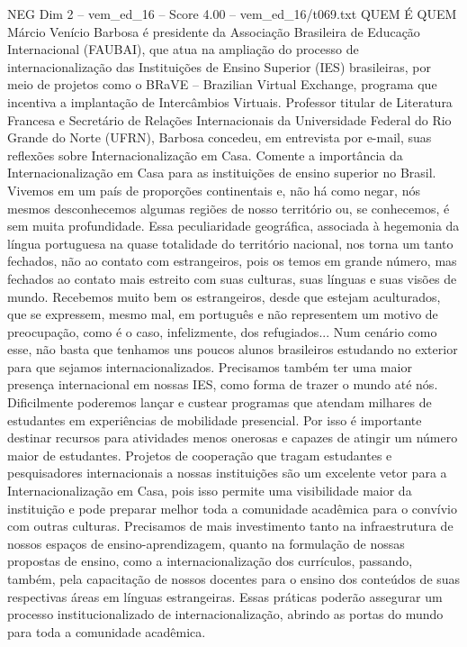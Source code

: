 \begin{textsample}{NEG Dim 2 – vem\_ed\_16 – Score 4.00 – vem\_ed\_16/t069.txt}  \label{ex:f2_neg_102}
QUEM É QUEM Márcio Venício Barbosa é presidente da Associação Brasileira de Educação Internacional (FAUBAI), que atua na ampliação do processo de internacionalização das Instituições de Ensino Superior (IES) brasileiras, por meio de projetos como o BRaVE – Brazilian Virtual Exchange, programa que incentiva a implantação de Intercâmbios Virtuais.
Professor titular de Literatura Francesa e Secretário de Relações Internacionais da Universidade Federal do Rio Grande do Norte (UFRN), Barbosa concedeu, em entrevista por e-mail, suas reflexões sobre Internacionalização em Casa.
Comente a importância da Internacionalização em Casa para as instituições de ensino superior no Brasil.
Vivemos em um país de proporções continentais e, não há como negar, nós mesmos desconhecemos algumas regiões de nosso território ou, se conhecemos, é sem muita profundidade.
Essa peculiaridade geográfica, associada à hegemonia da língua portuguesa na quase totalidade do território nacional, nos torna um tanto fechados, não ao contato com estrangeiros, pois os temos em grande número, mas fechados ao contato mais estreito com suas culturas, suas línguas e suas visões de mundo.
Recebemos muito bem os estrangeiros, desde que estejam aculturados, que se expressem, mesmo mal, em português e não representem um motivo de preocupação, como é o caso, infelizmente, dos refugiados...
Num cenário como esse, não basta que tenhamos uns poucos alunos brasileiros estudando no exterior para que sejamos internacionalizados.
Precisamos também ter uma maior presença internacional em nossas IES, como forma de trazer o mundo até nós.
Dificilmente poderemos lançar e custear programas que atendam milhares de estudantes em experiências de mobilidade presencial.
Por isso é importante destinar recursos para atividades menos onerosas e capazes de atingir um número maior de estudantes.
Projetos de cooperação que tragam estudantes e pesquisadores internacionais a nossas instituições são um excelente vetor para a Internacionalização em Casa, pois isso permite uma visibilidade maior da instituição e pode preparar melhor toda a comunidade acadêmica para o convívio com outras culturas.
Precisamos de mais investimento tanto na infraestrutura de nossos espaços de ensino-aprendizagem, quanto na formulação de nossas propostas de ensino, como a internacionalização dos currículos, passando, também, pela capacitação de nossos docentes para o ensino dos conteúdos de suas respectivas áreas em línguas estrangeiras.
Essas práticas poderão assegurar um processo institucionalizado de internacionalização, abrindo as portas do mundo para toda a comunidade acadêmica.

\end{textsample}
